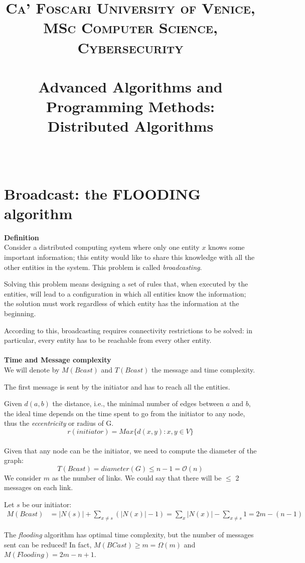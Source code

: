 \documentclass[paper=a4, fontsize=11pt]{scrartcl} %
\title{	
\normalfont \normalsize 
\textsc{Ca' Foscari University of Venice, MSc Computer Science, Cybersecurity} \\ [25pt] %
\horrule{0.5pt} \\[0.4cm] %
\huge Advanced Algorithms and Programming Methods: Distributed Algorithms \\ %
\horrule{2pt} \\[0.5cm] %
}
\numberwithin{equation}{section} %
\numberwithin{figure}{section} %
\numberwithin{table}{section} %
\begin{document}
\maketitle %

\section*{Broadcast: the FLOODING algorithm}
\textbf{Definition} \\
Consider a distributed computing system where only one entity $x$ knows some important information; this entity would like to share this knowledge with all the other entities in the system. This problem is called \textit{broadcasting}.

Solving this problem means designing a set of rules that, when executed by the entities, will lead to a configuration in which all entities know the information; the solution must work regardless of which entity has the information at the beginning.

According to this, broadcasting requires connectivity restrictions to be solved: in particular, every entity has to be reachable from every other entity. \\ \\

\textbf{Time and Message complexity} \\
We will denote by $M(Bcast)$ and $T(Bcast)$ the message and time complexity.

The first message is sent by the initiator and has to reach all the entities.

Given $d(a, b)$ the distance, i.e., the minimal number of edges between $a$ and $b$, the ideal time depends on the time spent to go from the initiator to any node, thus the \textit{eccentricity} or radius of G.
$$r(initiator) = Max\{d(x,y) : x,y \in V\}$$
~ \\
Given that any node can be the initiator, we need to compute the diameter of the graph:
$$T(Bcast) = diameter(G) \leq n-1 = \mathcal{O}(n)$$
We consider $m$ as the number of links. We could say that there will be $\leq$ 2 messages on each link.

Let $s$ be our initiator: 
\begin{align*}
	M(Bcast) &= |N(s)| + \sum_{x \neq s} (|N(x)|-1) 
			 = \sum_{x}|N(x)| - \sum_{x \neq s}1 
	         = 2m - (n-1)
\end{align*}

The \textit{flooding} algorithm has optimal time complexity, but the number of messages sent can be reduced! In fact, $M(BCast) \ge m = \Omega(m)$ and $M(Flooding) = 2m - n + 1$. 
\end{document}
